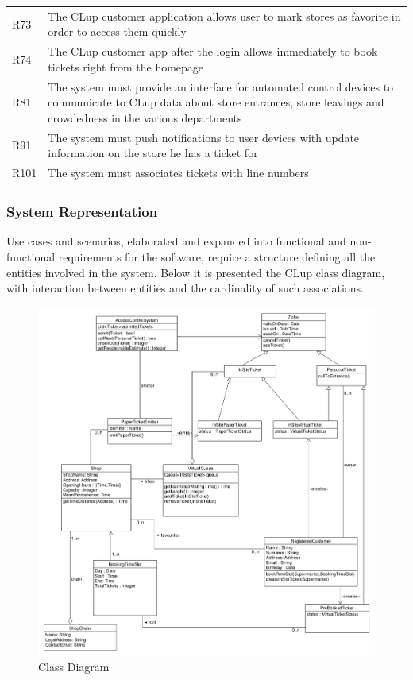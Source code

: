 \begin{tabular}{C{1cm}L{14.1cm}}
    R73   & The CLup customer application allows user to mark stores as favorite in order to access them quickly                                                                            \\
    R74   & The CLup customer app after the login allows immediately to book tickets right from the homepage                                                                                \\
    R81   & The system must provide an interface for automated control devices to communicate to CLup data about store entrances, store leavings and crowdedness in the various departments \\
    R91   & The system must push notifications to user devices with update information on the store he has a ticket for                                                                     \\
    R101  & The system must associates tickets with line numbers                                                                                                                            \\
\end{tabular}
\vfill
\pagebreak

\subsubsection{System Representation}

Use cases and scenarios, elaborated and expanded into functional and non-functional requirements for the software, require a structure defining all the entities involved in the system.
Below it is presented the CLup class diagram, with interaction between entities and the cardinality of such associations.

\begin{figure}[H]
    \centering
    \includegraphics[width=\textwidth]{Images/UML_class_synthetic.png}
    \caption{\label{fig:Booked_Ticket_State}Class Diagram}
\end{figure}

\vfill
\pagebreak
